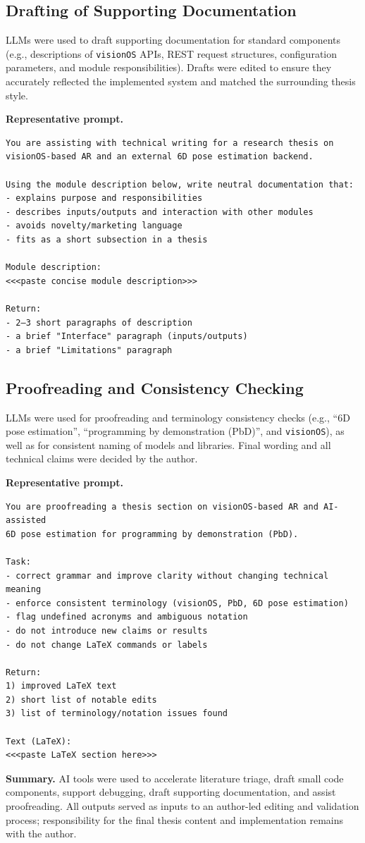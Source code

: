 \subsection{Drafting of Supporting Documentation}
\label{appendix:ai-docs}

LLMs were used to draft supporting documentation for standard components (e.g., descriptions of \texttt{visionOS} APIs, REST request structures, configuration parameters, and module responsibilities). Drafts were edited to ensure they accurately reflected the implemented system and matched the surrounding thesis style.

\textbf{Representative prompt.}
\begin{verbatim}
You are assisting with technical writing for a research thesis on
visionOS-based AR and an external 6D pose estimation backend.

Using the module description below, write neutral documentation that:
- explains purpose and responsibilities
- describes inputs/outputs and interaction with other modules
- avoids novelty/marketing language
- fits as a short subsection in a thesis

Module description:
<<<paste concise module description>>>

Return:
- 2–3 short paragraphs of description
- a brief "Interface" paragraph (inputs/outputs)
- a brief "Limitations" paragraph
\end{verbatim}

\subsection{Proofreading and Consistency Checking}
\label{appendix:ai-proofreading}

LLMs were used for proofreading and terminology consistency checks (e.g., ``$6$D pose estimation'', ``programming by demonstration (PbD)'', and \texttt{visionOS}), as well as for consistent naming of models and libraries. Final wording and all technical claims were decided by the author.

\textbf{Representative prompt.}
\begin{verbatim}
You are proofreading a thesis section on visionOS-based AR and AI-assisted
6D pose estimation for programming by demonstration (PbD).

Task:
- correct grammar and improve clarity without changing technical meaning
- enforce consistent terminology (visionOS, PbD, 6D pose estimation)
- flag undefined acronyms and ambiguous notation
- do not introduce new claims or results
- do not change LaTeX commands or labels

Return:
1) improved LaTeX text
2) short list of notable edits
3) list of terminology/notation issues found

Text (LaTeX):
<<<paste LaTeX section here>>>
\end{verbatim}


\textbf{Summary.}
AI tools were used to accelerate literature triage, draft small code components, support debugging, draft supporting documentation, and assist proofreading. All outputs served as inputs to an author-led editing and validation process; responsibility for the final thesis content and implementation remains with the author.
